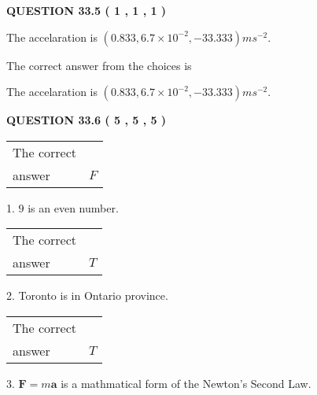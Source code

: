 \documentclass[12pt]{article}
\begin{document}
 
 
 
  
\vspace{0.2in}
  
{\textbf{\Large{QUESTION
33.5 
 (           1 ,           1 ,           1 )
}}}
  
  


 
 
\noindent{}
 
 
The accelaration is $  %
(
0.833,
6.7 \times 10^{-2},
-33.333)
ms^{-2} $.
 
 
 
 
 
 
\noindent{}

The correct answer from the choices is


The accelaration is $  %
(
0.833,
6.7 \times 10^{-2},
-33.333)
ms^{-2} $.
 
 
 
  
\vspace{0.2in}
  
{\textbf{\Large{QUESTION
33.6 
 (           5 ,           5 ,           5 )
}}}
  
  
 
 
\noindent{}

 
\noindent\begin{tabular}{|l|l|}\hline The correct & \\
          answer &  %
$F$ \\ \hline \end{tabular}
1. $ %
9$ is an  %
even number.
 
\noindent\begin{tabular}{|l|l|}\hline The correct & \\
          answer &  %
$T$ \\ \hline \end{tabular}
2.  %
Toronto is in  %
Ontario province.
 
\noindent\begin{tabular}{|l|l|}\hline The correct & \\
          answer &  %
$T$ \\ \hline \end{tabular}
3.  %
$\mathbf{F}=m\mathbf{a}$ is a mathmatical form of  %
the Newton's Second Law.
 
\end{document}
